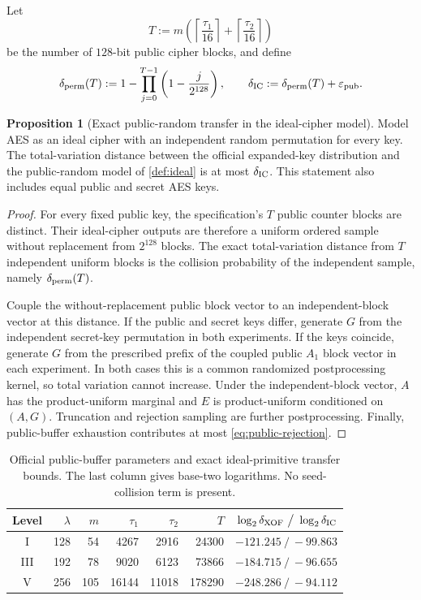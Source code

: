 \documentclass[11pt,a4paper]{article}
\theoremstyle{definition}
\newtheorem{proposition}[theorem]{Proposition}
\theoremstyle{remark}
\begin{document}
Let
\[
T:=m\left(\left\lceil\frac{\tau_1}{16}\right\rceil
          +\left\lceil\frac{\tau_2}{16}\right\rceil\right)
\]
be the number of $128$-bit public cipher blocks, and define
\begin{equation}\label{eq:ideal-cipher-distance}
\delta_{\rm perm}(T)
:=1-\prod_{j=0}^{T-1}\left(1-\frac{j}{2^{128}}\right),
\qquad
\delta_{\rm IC}:=\delta_{\rm perm}(T)+\varepsilon_{\rm pub}.
\end{equation}

\begin{proposition}[Exact public-random transfer in the ideal-cipher model]\label{prop:icm-transfer}
Model AES as an ideal cipher with an independent random permutation for every key.  The total-variation distance between the official expanded-key distribution and the public-random model of \cref{def:ideal} is at most $\delta_{\rm IC}$.  This statement also includes equal public and secret AES keys.
\end{proposition}

\begin{proof}
For every fixed public key, the specification's $T$ public counter blocks are distinct.  Their ideal-cipher outputs are therefore a uniform ordered sample without replacement from $2^{128}$ blocks.  The exact total-variation distance from $T$ independent uniform blocks is the collision probability of the independent sample, namely $\delta_{\rm perm}(T)$.

Couple the without-replacement public block vector to an independent-block vector at this distance.  If the public and secret keys differ, generate $G$ from the independent secret-key permutation in both experiments.  If the keys coincide, generate $G$ from the prescribed prefix of the coupled public $A_1$ block vector in each experiment.  In both cases this is a common randomized postprocessing kernel, so total variation cannot increase.  Under the independent-block vector, $A$ has the product-uniform marginal and $E$ is product-uniform conditioned on $(A,G)$.  Truncation and rejection sampling are further postprocessing.  Finally, public-buffer exhaustion contributes at most \eqref{eq:public-rejection}.
\end{proof}

\begin{table}[t]
\centering
\small
\setlength{\tabcolsep}{4.3pt}
\caption{Official public-buffer parameters and exact ideal-primitive transfer bounds.  The last column gives base-two logarithms.  No seed-collision term is present.}
\label{tab:seeded-model-bounds}
\begin{tabular}{@{}c r r r r r r@{}}
\toprule
Level & $\lambda$ & $m$ & $\tau_1$ & $\tau_2$ & $T$ & $\log_2\delta_{\rm XOF}\ \big/\ \log_2\delta_{\rm IC}$\\
\midrule
I   &128&54 &4267 &2916 &24300  &$-121.245\ /\ -99.863$\\
III &192&78 &9020 &6123 &73866  &$-184.715\ /\ -96.655$\\
V   &256&105&16144&11018&178290 &$-248.286\ /\ -94.112$\\
\bottomrule
\end{tabular}
\end{table}
\end{document}
